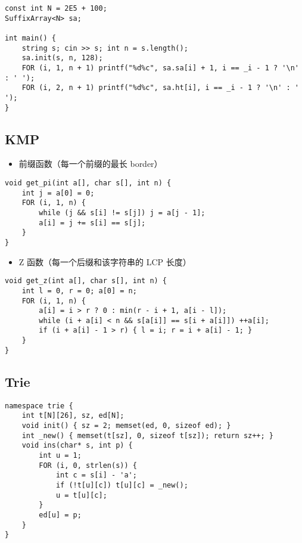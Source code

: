 \documentclass[]{article}
\providecommand{\tightlist}{%
  \setlength{\itemsep}{0pt}\setlength{\parskip}{0pt}}
\begin{document}
\begin{verbatim}
const int N = 2E5 + 100;
SuffixArray<N> sa;

int main() {
    string s; cin >> s; int n = s.length();
    sa.init(s, n, 128);
    FOR (i, 1, n + 1) printf("%d%c", sa.sa[i] + 1, i == _i - 1 ? '\n' : ' ');
    FOR (i, 2, n + 1) printf("%d%c", sa.ht[i], i == _i - 1 ? '\n' : ' ');
}
\end{verbatim}

\hypertarget{kmp}{%
\subsection{KMP}\label{kmp}}

\begin{itemize}
\tightlist
\item
  前缀函数（每一个前缀的最长 border）
\end{itemize}

\begin{verbatim}
void get_pi(int a[], char s[], int n) {
    int j = a[0] = 0;
    FOR (i, 1, n) {
        while (j && s[i] != s[j]) j = a[j - 1];
        a[i] = j += s[i] == s[j];
    }
}
\end{verbatim}

\begin{itemize}
\tightlist
\item
  Z 函数（每一个后缀和该字符串的 LCP 长度）
\end{itemize}

\begin{verbatim}
void get_z(int a[], char s[], int n) {
    int l = 0, r = 0; a[0] = n;
    FOR (i, 1, n) {
        a[i] = i > r ? 0 : min(r - i + 1, a[i - l]);
        while (i + a[i] < n && s[a[i]] == s[i + a[i]]) ++a[i];
        if (i + a[i] - 1 > r) { l = i; r = i + a[i] - 1; }
    }
}
\end{verbatim}

\hypertarget{trie}{%
\subsection{Trie}\label{trie}}

\begin{verbatim}
namespace trie {
    int t[N][26], sz, ed[N];
    void init() { sz = 2; memset(ed, 0, sizeof ed); }
    int _new() { memset(t[sz], 0, sizeof t[sz]); return sz++; }
    void ins(char* s, int p) {
        int u = 1;
        FOR (i, 0, strlen(s)) {
            int c = s[i] - 'a';
            if (!t[u][c]) t[u][c] = _new();
            u = t[u][c];
        }
        ed[u] = p;
    }
}
\end{verbatim}
\end{document}
